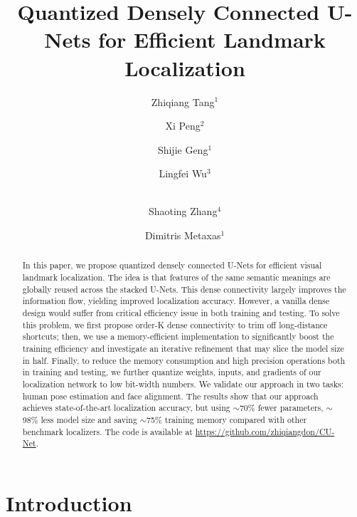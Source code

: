 \documentclass[runningheads]{llncs}
\begin{document}
\title{Quantized Densely Connected U-Nets for Efficient Landmark Localization}

\author{Zhiqiang Tang$^1$ \and
Xi Peng$^2$ \and
Shijie Geng$^1$ \and Lingfei Wu$^3$ \and \\Shaoting Zhang$^4$ \and Dimitris Metaxas$^1$}



\maketitle

\begin{abstract}


  


  In this paper, we propose quantized densely connected U-Nets for efficient visual landmark localization. The idea is that features of the same semantic meanings are globally reused across the stacked U-Nets. This dense connectivity largely improves the information flow, yielding improved localization accuracy. However, a vanilla dense design would suffer from critical efficiency issue in both training and testing. To solve this problem, we first propose order-K dense connectivity to trim off long-distance shortcuts; then, we use a memory-efficient implementation to significantly boost the training efficiency and investigate an iterative refinement that may slice the model size in half. 
Finally, to reduce the memory consumption and high precision operations both in training and testing, we further quantize weights, inputs, and gradients of our localization network to low bit-width numbers.
  We validate our approach in two tasks: human pose estimation and face alignment. The results show that our approach achieves state-of-the-art localization accuracy, but using $\sim$70\% fewer parameters, $\sim$98\% less model size and saving $\sim$75\% training memory compared with other benchmark localizers. The code is available at \href{https://github.com/zhiqiangdon/CU-Net}{https://github.com/zhiqiangdon/CU-Net}. 
  


\end{abstract} \section{Introduction}
\end{document}
